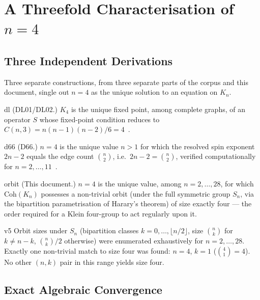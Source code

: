 \documentclass[11pt,a4paper]{article}
\newcommand{\Kfour}{K_4}
\newcommand{\Coh}{\mathrm{Coh}}
\begin{document}
\section{A Threefold Characterisation of \texorpdfstring{$n=4$}{n=4}}
\label{sec:threefold}

\subsection{Three Independent Derivations}

Three separate constructions, from three separate parts of the corpus and this document, single out $n=4$ as the unique solution to an equation on $K_n$.

\begin{theorembox}{}{dl}
(DL01/DL02.) $\Kfour$ is the unique fixed point, among complete graphs, of an operator $S$ whose fixed-point condition reduces to $C(n,3)=n(n-1)(n-2)/6=4$~\citep{DL01,DL02}.
\end{theorembox}

\begin{theorembox}{}{d66}
(D66.) $n=4$ is the unique value $n>1$ for which the resolved spin exponent $2n-2$ equals the edge count $\binom{n}{2}$, i.e.\ $2n-2=\binom{n}{2}$, verified computationally for $n=2,\dots,11$~\citep{D66}.
\end{theorembox}

\begin{theorembox}{}{orbit}
(This document.) $n=4$ is the unique value, among $n=2,\dots,28$, for which $\Coh(K_n)$ possesses a non-trivial orbit (under the full symmetric group $S_n$, via the bipartition parametrisation of Harary's theorem) of size exactly four --- the order required for a Klein four-group to act regularly upon it.
\end{theorembox}

\begin{verifbox}{}{v5}
Orbit sizes under $S_n$ (bipartition classes $k=0,\dots,\lfloor n/2\rfloor$, size $\binom nk$ for $k\ne n-k$, $\binom nk/2$ otherwise) were enumerated exhaustively for $n=2,\dots,28$. Exactly one non-trivial match to size four was found: $n=4$, $k=1$ ($\binom41=4$). No other $(n,k)$ pair in this range yields size four.
\end{verifbox}

\subsection{Exact Algebraic Convergence}
\end{document}
